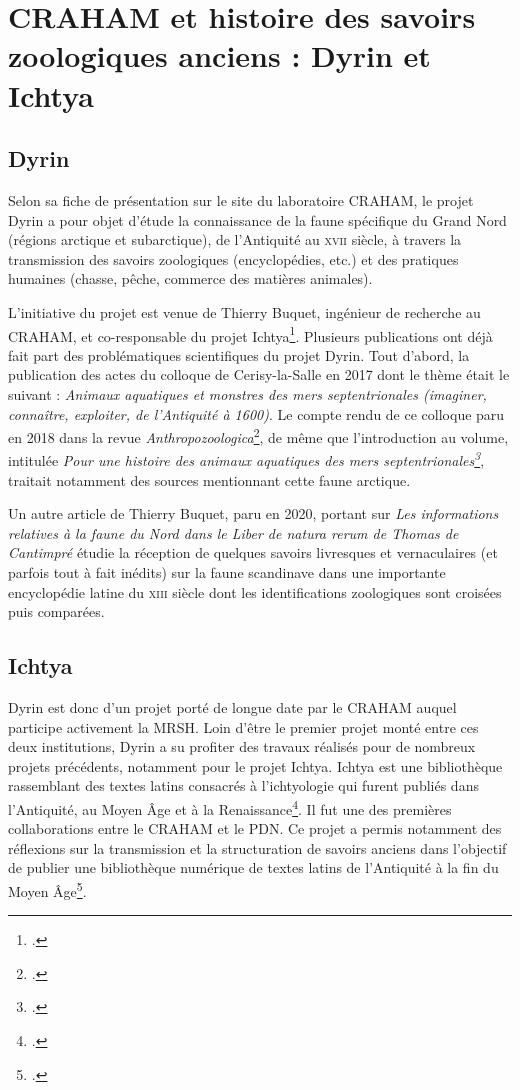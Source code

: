 \documentclass[a4paper,12pt,twoside]{book}
\begin{document}
\chapter{CRAHAM et histoire des savoirs zoologiques anciens : Dyrin et Ichtya}
    \section{Dyrin}
    Selon sa fiche de présentation sur le site du laboratoire \acrshort{CRAHAM}, le projet Dyrin a pour objet d'étude \og la connaissance de la faune spécifique du Grand Nord (régions arctique et subarctique), de l'Antiquité au \textsc{xvii}\ieme{} siècle, à travers la transmission des savoirs zoologiques (encyclopédies, etc.) et des pratiques humaines (chasse, pêche, commerce des matières animales)\fg.
    
   L'initiative du projet est venue de Thierry Buquet, ingénieur de recherche au \acrshort{CRAHAM}, et co-responsable du projet Ichtya\footcite{ichtya}. Plusieurs publications ont déjà fait part des problématiques scientifiques du projet Dyrin. Tout d'abord, la publication des actes du colloque de Cerisy-la-Salle en 2017 dont le thème était le suivant : \og \textit{Animaux aquatiques et monstres des mers septentrionales (imaginer, connaître, exploiter, de l'Antiquité à 1600)}\fg. Le compte rendu de ce colloque paru en 2018 dans la revue \textit{Anthropozoologica}\footcite{aquatique}, de même que l'introduction au volume, intitulée \og \textit{Pour une histoire des animaux aquatiques des mers septentrionales\footcite{natura}}\fg, traitait notamment des sources mentionnant cette faune arctique.
   
   Un autre article de Thierry Buquet, paru en 2020, portant sur \og \textit{Les informations relatives à la faune du Nord dans le Liber de natura rerum de Thomas de Cantimpré}\fg{} étudie la réception de quelques savoirs livresques et vernaculaires (et parfois tout à fait inédits) sur la faune scandinave dans une importante encyclopédie latine du \textsc{xiii}\ieme{} siècle dont les identifications zoologiques sont croisées puis comparées.
   
    \section{Ichtya}
   Dyrin est donc d'un projet porté de longue date par le \acrshort{CRAHAM} auquel participe activement la \acrfull{MRSH}. Loin d'être le premier projet monté entre ces deux institutions, Dyrin a su profiter des travaux réalisés pour de nombreux projets précédents, notamment pour le projet Ichtya. Ichtya est une bibliothèque rassemblant des textes latins consacrés à l'ichtyologie qui furent publiés dans l'Antiquité, au Moyen Âge et à la Renaissance\footcite{ichtya}. Il fut une des premières collaborations entre le \acrshort{CRAHAM} et le \acrshort{PDN}. Ce projet a permis notamment des
   réflexions sur la transmission et la structuration de savoirs anciens dans l'objectif de publier une bibliothèque numérique de textes latins de l'Antiquité à la fin du Moyen Âge\footcite{buquet_ichtya_nodate}.
   
\end{document}
